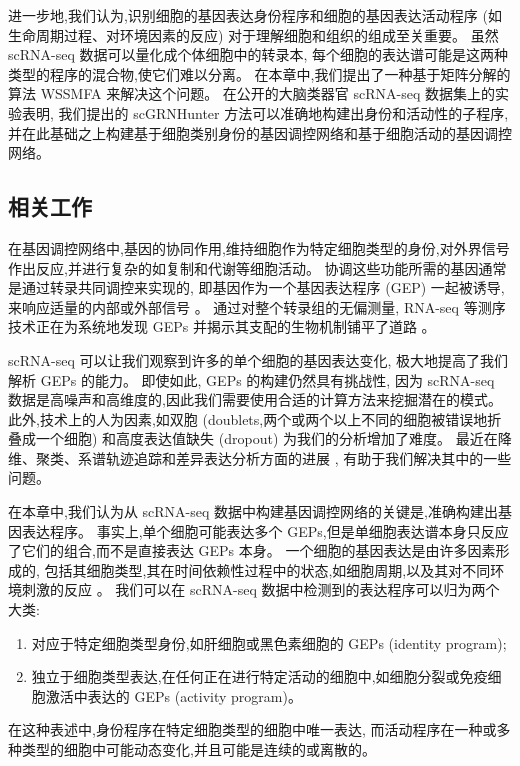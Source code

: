 进一步地,我们认为,识别细胞的基因表达身份程序和细胞的基因表达活动程序 (如生命周期过程、对环境因素的反应) 
对于理解细胞和组织的组成至关重要。
虽然 scRNA-seq 数据可以量化成个体细胞中的转录本,
每个细胞的表达谱可能是这两种类型的程序的混合物,使它们难以分离。
在本章中,我们提出了一种基于矩阵分解的算法 WSSMFA 来解决这个问题。
在公开的大脑类器官 scRNA-seq 数据集上的实验表明,
我们提出的 scGRNHunter 方法可以准确地构建出身份和活动性的子程序, 
并在此基础之上构建基于细胞类别身份的基因调控网络和基于细胞活动的基因调控网络。

\subsection{相关工作}
在基因调控网络中,基因的协同作用,维持细胞作为特定细胞类型的身份,对外界信号作出反应,并进行复杂的如复制和代谢等细胞活动。
协调这些功能所需的基因通常是通过转录共同调控来实现的,
即基因作为一个基因表达程序 (GEP) 一起被诱导,
来响应适量的内部或外部信号 \cite{eisen1998cluster,segal2003module}。
通过对整个转录组的无偏测量, RNA-seq 等测序技术正在为系统地发现 GEPs 并揭示其支配的生物机制铺平了道路 \cite{liberzon2015molecular}。

scRNA-seq 可以让我们观察到许多的单个细胞的基因表达变化,
极大地提高了我们解析 GEPs 的能力。
即使如此, GEPs 的构建仍然具有挑战性,
因为 scRNA-seq 数据是高噪声和高维度的,因此我们需要使用合适的计算方法来挖掘潜在的模式。
此外,技术上的人为因素,如双胞 (doublets,两个或两个以上不同的细胞被错误地折叠成一个细胞) 和高度表达值缺失 (dropout) 为我们的分析增加了难度。
最近在降维、聚类、系谱轨迹追踪和差异表达分析方面的进展 \cite{amir2013visne,kharchenko2014bayesian,satija2015spatial,trapnell2014dynamics},
有助于我们解决其中的一些问题。

在本章中,我们认为从 scRNA-seq 数据中构建基因调控网络的关键是,准确构建出基因表达程序。
事实上,单个细胞可能表达多个 GEPs,但是单细胞表达谱本身只反应了它们的组合,而不是直接表达 GEPs 本身。
一个细胞的基因表达是由许多因素形成的,
包括其细胞类型,其在时间依赖性过程中的状态,如细胞周期,以及其对不同环境刺激的反应 \cite{wagner2016revealing}。
我们可以在 scRNA-seq 数据中检测到的表达程序可以归为两个大类:
\begin{enumerate}[label=(\arabic*),itemindent=2em]
    \item 对应于特定细胞类型身份,如肝细胞或黑色素细胞的 GEPs (identity program);
    \item 独立于细胞类型表达,在任何正在进行特定活动的细胞中,如细胞分裂或免疫细胞激活中表达的 GEPs (activity program)。
\end{enumerate}
在这种表述中,身份程序在特定细胞类型的细胞中唯一表达,
而活动程序在一种或多种类型的细胞中可能动态变化,并且可能是连续的或离散的。

